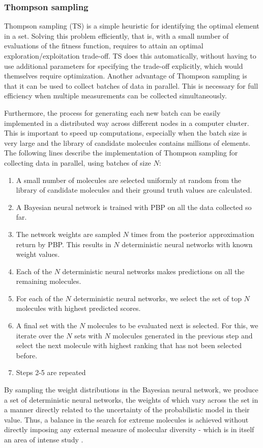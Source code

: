 \subsubsection{Thompson sampling}

Thompson sampling (TS) \cite{Thompson_1933} is a simple heuristic for identifying the optimal element in a set. Solving this problem efficiently, that is, with a small number of evaluations of the fitness function, requires to attain an optimal exploration/exploitation trade-off. TS does this automatically, without having to use additional parameters for specifying the trade-off explicitly, which would themselves require optimization. Another advantage of Thompson sampling is that it can be used to collect batches of data in parallel. This is necessary for full efficiency when multiple measurements can be collected simultaneously.

Furthermore, the process for generating each new batch can be easily implemented in a distributed way across different nodes in a computer cluster. This is important to speed up computations, especially when the batch size is very large and the library of candidate molecules contains millions of elements. The following lines describe the implementation of Thompson sampling for collecting data in parallel, using batches of size $N$:
\begin{enumerate}
\item A small number of molecules are selected uniformly at random from the library of candidate molecules and their ground truth values are calculated.
\item A Bayesian neural network is trained with PBP on all the data collected so far.
\item The network weights are sampled $N$ times from the posterior approximation return by PBP. This results in $N$ deterministic neural networks with known weight values.
\item Each of the $N$ deterministic neural networks makes predictions on all the remaining molecules.
\item For each of the $N$ deterministic neural networks, we select the set of top $N$ molecules with highest predicted scores.
\item A final set with the $N$ molecules to be evaluated next is selected. For this, we iterate over the $N$ sets with $N$ molecules generated in the previous step and select the next molecule with highest ranking that has not been selected before.
\item Steps 2-5 are repeated
\end{enumerate}
By sampling the weight distributions in the Bayesian neural network, we produce a set of deterministic neural networks, the weights of which vary across the set in a manner directly related to the uncertainty of the probabilistic model in their value.  Thus, a balance in the search for extreme molecules is achieved without directly imposing any external measure of molecular diversity - which is in itself an area of intense study \cite{Maldonado_2006}.